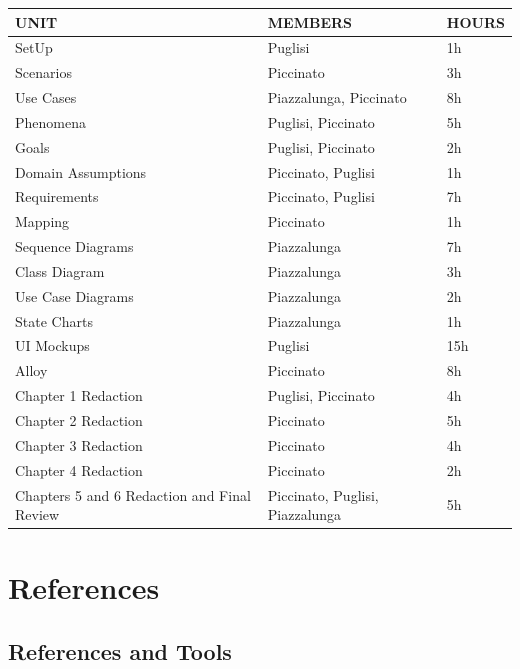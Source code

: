 \documentclass{Configuration_Files/Template}
\begin{document}
\begin{table}[h]
\centering
\begin{tabularx}{\textwidth}{| X | X | X |}
\hline
\textbf{UNIT} & \textbf{MEMBERS} & \textbf{HOURS} \\ [1ex]
\hline
SetUp & Puglisi & 1h \\ [1ex]
\hline
Scenarios & Piccinato & 3h \\ [1ex]
\hline
Use Cases & Piazzalunga, Piccinato & 8h \\ [1ex]
\hline
Phenomena & Puglisi, Piccinato & 5h \\ [1ex]
\hline
Goals & Puglisi, Piccinato & 2h \\ [1ex]
\hline
Domain Assumptions & Piccinato, Puglisi & 1h \\ [1ex]
\hline
Requirements & Piccinato, Puglisi & 7h \\ [1ex]
\hline
Mapping & Piccinato & 1h \\ [1ex]
\hline
Sequence Diagrams & Piazzalunga & 7h \\ [1ex]
\hline
Class Diagram & Piazzalunga & 3h \\ [1ex]
\hline
Use Case Diagrams & Piazzalunga & 2h \\ [1ex]
\hline
State Charts & Piazzalunga & 1h \\ [1ex]
\hline
UI Mockups & Puglisi & 15h \\ [1ex]
\hline
Alloy & Piccinato & 8h \\ [1ex]
\hline
Chapter 1 Redaction & Puglisi, Piccinato & 4h \\ [1ex]
\hline
Chapter 2 Redaction & Piccinato & 5h \\ [1ex]
\hline
Chapter 3 Redaction & Piccinato & 4h \\ [1ex]
\hline
Chapter 4 Redaction & Piccinato & 2h \\ [1ex]
\hline
Chapters 5 and 6 Redaction and Final Review & Piccinato, Puglisi, Piazzalunga & 5h \\ [1ex]
\hline
\end{tabularx}
\end{table}

\chapter{References}

\section{References and Tools}
\end{document}
